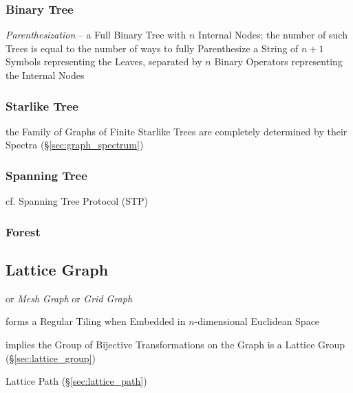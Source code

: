 \subsubsection{Binary Tree}\label{sec:binary_tree}

\emph{Parenthesization} -- a Full Binary Tree with $n$ Internal Nodes; the
number of such Trees is equal to the number of ways to fully Parenthesize a
String of $n+1$ Symbols representing the Leaves, separated by $n$ Binary
Operators representing the Internal Nodes



\subsubsection{Starlike Tree}\label{sec:starlike_tree}

the Family of Graphs of Finite Starlike Trees are completely determined by
their Spectra (\S\ref{sec:graph_spectrum})



\subsubsection{Spanning Tree}\label{sec:spanning_tree}

cf. Spanning Tree Protocol (STP)



\subsubsection{Forest}\label{sec:forest}



\subsection{Lattice Graph}\label{sec:lattice_graph}

or \emph{Mesh Graph} or \emph{Grid Graph}

forms a Regular Tiling when Embedded in $n$-dimensional Euclidean Space

implies the Group of Bijective Transformations on the Graph is a Lattice Group
(\S\ref{sec:lattice_group})

Lattice Path (\S\ref{sec:lattice_path})



